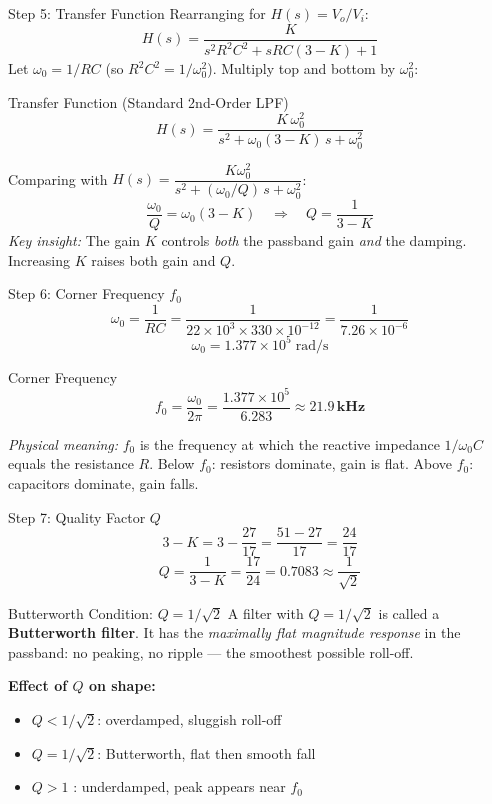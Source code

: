 \documentclass{beamer}
\begin{document}
\begin{frame}{Step 5: Transfer Function}
  Rearranging for $H(s) = V_o/V_i$:
  \[
    H(s) = \frac{K}{s^2R^2C^2 + sRC(3-K) + 1}
  \]
  Let $\omega_0 = 1/RC$ (so $R^2C^2 = 1/\omega_0^2$). Multiply top and bottom by $\omega_0^2$:
  \begin{block}{Transfer Function (Standard 2nd-Order LPF)}
    \[
      \boxed{H(s) = \frac{K\,\omega_0^2}{s^2 + \omega_0(3-K)\,s + \omega_0^2}}
    \]
  \end{block}
  \vspace{0.4em}
  Comparing with $H(s) = \dfrac{K\omega_0^2}{s^2 + (\omega_0/Q)\,s + \omega_0^2}$:
  \[
    \frac{\omega_0}{Q} = \omega_0(3-K) \quad\Longrightarrow\quad Q = \frac{1}{3-K}
  \]
  \textit{Key insight:} The gain $K$ controls \textit{both} the passband gain
  \textit{and} the damping. Increasing $K$ raises both gain and $Q$.
\end{frame}

\begin{frame}{Step 6: Corner Frequency $f_0$}
  \[
    \omega_0 = \frac{1}{RC} = \frac{1}{22\times10^3 \times 330\times10^{-12}}
             = \frac{1}{7.26\times10^{-6}}
  \]
  \[
    \omega_0 = 1.377\times10^5\;\text{rad/s}
  \]
  \begin{block}{Corner Frequency}
    \[
      f_0 = \frac{\omega_0}{2\pi} = \frac{1.377\times10^5}{6.283}
          \approx \mathbf{21.9\,\text{kHz}}
    \]
  \end{block}
  \vspace{0.4em}
  \textit{Physical meaning:} $f_0$ is the frequency at which the reactive
  impedance $1/\omega_0 C$ equals the resistance $R$. Below $f_0$: resistors
  dominate, gain is flat. Above $f_0$: capacitors dominate, gain falls.
\end{frame}

\begin{frame}{Step 7: Quality Factor $Q$}
  \[
    3 - K = 3 - \frac{27}{17} = \frac{51 - 27}{17} = \frac{24}{17}
  \]
  \[
    Q = \frac{1}{3-K} = \frac{17}{24} = 0.7083 \approx \frac{1}{\sqrt{2}}
  \]
  \begin{block}{Butterworth Condition: $Q = 1/\sqrt{2}$}
    A filter with $Q = 1/\sqrt{2}$ is called a \textbf{Butterworth filter}.
    It has the \textit{maximally flat magnitude response} in the passband:
    no peaking, no ripple --- the smoothest possible roll-off.
  \end{block}
  \vspace{0.3em}
  \textbf{Effect of $Q$ on shape:}
  \begin{itemize}
    \item $Q < 1/\sqrt{2}$: overdamped, sluggish roll-off
    \item $Q = 1/\sqrt{2}$: Butterworth, flat then smooth fall
    \item $Q > 1$ : underdamped, peak appears near $f_0$
  \end{itemize}
\end{frame}
\end{document}
